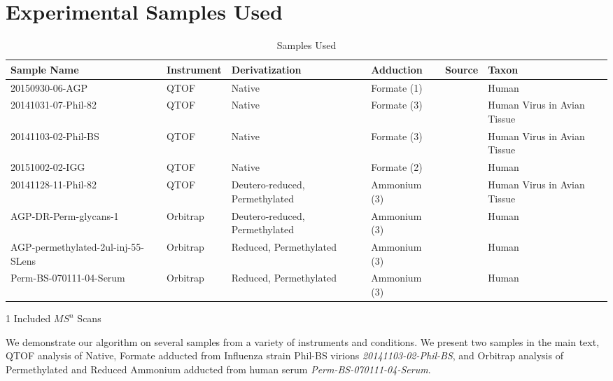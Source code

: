 \section{Experimental Samples Used}\label{sec:sample_description}
    \begin{table}
    \caption{Samples Used}\label{tab:sample_overview}
    \scriptsize
    \centering
    \begin{threeparttable}
    \begin{tabular}{p{4.1cm} | p{1.5cm} | p{2.5cm} | p{2cm} | p{3cm} | p{2cm}}
        \toprule
        Sample Name & Instrument & Derivatization & Adduction & Source & Taxon  \\
        \midrule
        20150930-06-AGP & QTOF & Native & Formate (1) & \cite{Khatri2016a} & Human\\
        20141031-07-Phil-82 & QTOF & Native & Formate (3) & \cite{Khatri2016a} & Human Virus in Avian Tissue\\
        20141103-02-Phil-BS & QTOF & Native & Formate (3) & \cite{Khatri2016a} & Human Virus in Avian Tissue\\
        20151002-02-IGG & QTOF & Native & Formate (2) & \cite{Khatri2016b} & Human\\
        20141128-11-Phil-82\tnote{1} & QTOF &
            Deutero-reduced, Permethylated & Ammonium (3) & \cite{Khatri2016a} & Human Virus in Avian Tissue\\
        AGP-DR-Perm-glycans-1\tnote{1} & Orbitrap &
            Deutero-reduced, Permethylated & Ammonium (3) & \cite{Khatri2016a} & Human\\
        AGP-permethylated-2ul-inj-55-SLens\tnote{1} & Orbitrap &
            Reduced, Permethylated & Ammonium (3) & \cite{Khatri2016a} & Human\\
        Perm-BS-070111-04-Serum\tnote{1} & Orbitrap &
            Reduced, Permethylated & Ammonium (3) & \cite{Yu2013,Hu2012} & Human\\
    \end{tabular}
    \begin{tablenotes}
        \item[1] Included $MS^n$ Scans
    \end{tablenotes}
    \end{threeparttable}
    \end{table}

    We demonstrate our algorithm on several samples from a variety of
    instruments and conditions. We present two samples in the main text,
    QTOF analysis of Native, Formate adducted \nglycans from Influenza
    strain Phil-BS virions \textit{20141103-02-Phil-BS}, and Orbitrap analysis
    of Permethylated and Reduced Ammonium adducted \nglycans from human
    serum \textit{Perm-BS-070111-04-Serum}.


